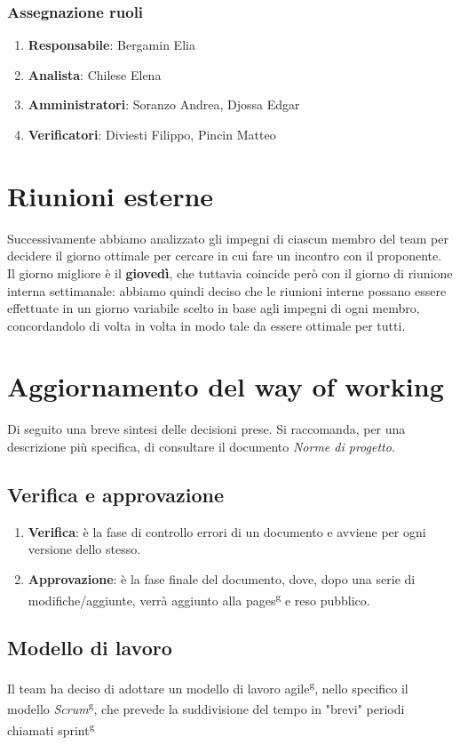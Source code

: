 \subsubsection{Assegnazione ruoli}
\begin{enumerate}
    \item \textbf{Responsabile}: Bergamin Elia
    \item \textbf{Analista}: Chilese Elena
    \item \textbf{Amministratori}: Soranzo Andrea, Djossa Edgar
    \item \textbf{Verificatori}: Diviesti Filippo, Pincin Matteo
\end{enumerate}

\section{Riunioni esterne}
Successivamente abbiamo analizzato gli impegni di ciascun membro del team per
decidere il giorno ottimale per cercare in cui fare un incontro con il
proponente.\\ Il giorno migliore è il \textbf{giovedì}, che tuttavia coincide
però con il giorno di riunione interna settimanale: abbiamo quindi deciso che le
riunioni interne possano essere effettuate in un giorno variabile scelto in
base agli impegni di ogni membro, concordandolo di volta in volta in modo tale
da essere ottimale per tutti.
\section{Aggiornamento del way of working}
Di seguito una breve sintesi delle decisioni prese. Si raccomanda, per una
descrizione più specifica, di consultare il documento \textit{Norme di
    progetto}.
\subsection{Verifica e approvazione}
\begin{enumerate}
    \item \textbf{Verifica}: è la fase di controllo errori di un documento e avviene per ogni versione dello stesso.
    \item \textbf{Approvazione}: è la fase finale del documento, dove, dopo una serie di modifiche/aggiunte, verrà aggiunto alla pages\textsuperscript{g} e reso pubblico.
\end{enumerate}
\subsection{Modello di lavoro}
Il team ha deciso di adottare un modello di lavoro agile\textsuperscript{g},
nello specifico il modello \textit{Scrum}\textsuperscript{g}, che prevede la
suddivisione del tempo in "brevi" periodi chiamati sprint\textsuperscript{g}

